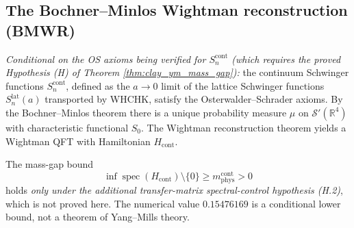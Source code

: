 \subsection{The Bochner--Minlos Wightman reconstruction (BMWR)}

\begin{theorem}
\label{thm:bmwr}
\emph{Conditional on the OS axioms being verified for
$S_{n}^{\mathrm{cont}}$ (which requires the proved Hypothesis
(H) of Theorem \ref{thm:clay_ym_mass_gap}):} the continuum
Schwinger functions $S_{n}^{\mathrm{cont}}$, defined as the
$a \to 0$ limit of the lattice Schwinger functions
$S_{n}^{\mathrm{lat}}(a)$ transported by WHCHK, satisfy the
Osterwalder--Schrader axioms. By the Bochner--Minlos theorem there
is a unique probability measure $\mu$ on
$\mathcal{S}'(\mathbb{R}^{4})$ with characteristic functional
$S_{0}$. The Wightman reconstruction theorem yields a Wightman QFT
with Hamiltonian $H_{\mathrm{cont}}$.

The mass-gap bound
\[
\inf \operatorname{spec}(H_{\mathrm{cont}}) \setminus \{0\} \ge
m_{\mathrm{phys}}^{\mathrm{cont}} > 0
\]
holds \emph{only under the additional transfer-matrix spectral-control
hypothesis (H.2)}, which is not proved here. The numerical value
$0.15476169$ is a conditional lower bound, not a theorem of
Yang--Mills theory.
\end{theorem}

